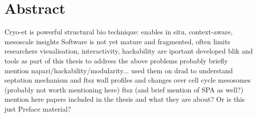 \section*{Abstract}

\begin{outline}
\1 Cryo-et is powerful structural bio technique: enables in situ, context-aware, mesoscale insights
\1 Software is not yet mature and fragmented, often limits researchers
\1 visualisation, interactivity, hackability are iportant
\1 developed blik and tools as part of this thesis to address the above problems
    \2 probably briefly mention napari/hackability/modularity...
\1 used them on drad to understand septation mechanism and ftsz
    \2 wall profiles and changes over cell cycle
    \2 mesosomes (probably not worth mentioning here)
    \2 ftsz (and brief mention of SPA as well?)
\1 mention here papers included in the thesis and what they are about? Or is this just Preface material?
\end{outline}

